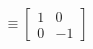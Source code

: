 \documentclass[preview]{standalone}
\begin{document}
\begin{align*}
\equiv \begin{bmatrix} 1 & 0 \\ 0 & -1 \end{bmatrix}
\end{align*}
\end{document}
